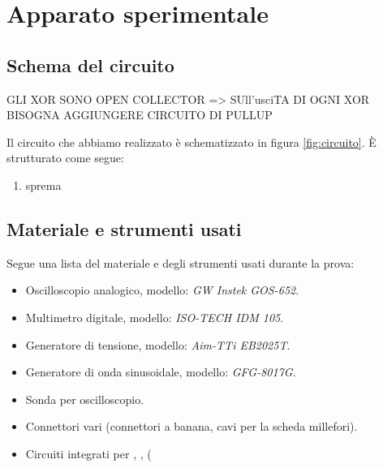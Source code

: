 \section{Apparato sperimentale}\label{sec:apparato-sperimentale}
\subsection{Schema del circuito}\label{subsec:schema-circuito}

GLI XOR SONO OPEN COLLECTOR => SUll'usciTA DI OGNI XOR BISOGNA AGGIUNGERE CIRCUITO DI PULLUP


Il circuito che abbiamo realizzato è schematizzato in figura \ref{fig:circuito}.
È strutturato come segue:
\begin{enumerate}
  \item%
  sprema %
\end{enumerate}

\subsection{Materiale e strumenti usati}\label{subsec:materiali}
Segue una lista del materiale e degli strumenti usati durante la prova:
\begin{itemize}
  \item%
  Oscilloscopio analogico, modello: \emph{GW Instek GOS-652}.
  \item%
  Multimetro digitale, modello: \emph{ISO-TECH IDM 105}.
  \item%
  Generatore di tensione, modello: \emph{Aim-TTi EB2025T}.
  \item%
  Generatore di onda sinusoidale, modello: \emph{GFG-8017G}.
  \item%
  Sonda per oscilloscopio.
  \item%
  Connettori vari (connettori a banana, cavi per la scheda millefori).
  \item%
  Circuiti integrati per , ,  (%

\end{itemize}
